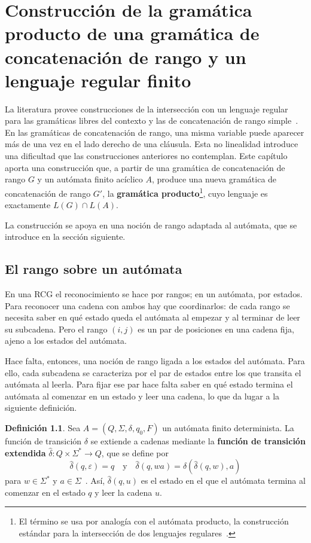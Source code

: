 \documentclass{report}
\theoremstyle{definition}
\newtheorem{definicion}{Definición}[chapter]
\theoremstyle{plain}
\begin{document}
\setcounter{chapter}{4}
\chapter{Construcción de la gramática producto de una gramática de concatenación de rango y un lenguaje regular finito}
\label{cap:interseccion}

La literatura provee construcciones de la intersección con un lenguaje
regular para las gramáticas libres del contexto y las de
concatenación de rango simple~\cite{barhillel1961, bertsch2001rcg}. En las gramáticas
de concatenación de rango, una misma variable puede aparecer más de una
vez en el lado derecho de una cláusula. Esta no linealidad introduce una
dificultad que las construcciones anteriores no contemplan. Este capítulo aporta una
construcción que, a partir de una gramática de concatenación de rango
$G$ y un autómata finito acíclico $A$, produce una nueva gramática de
concatenación de rango $G'$, la \textbf{gramática
producto}\footnote{El término se usa por analogía con el autómata
producto, la construcción estándar para la intersección de dos
lenguajes regulares~\cite{hopcroft2006introduction}.},
cuyo lenguaje es exactamente $L(G) \cap L(A)$.

La construcción se apoya en una noción de rango adaptada al autómata,
que se introduce en la sección siguiente.

\section{El rango sobre un autómata}

En una RCG el reconocimiento se hace por rangos; en un autómata, por
estados. Para reconocer una cadena con ambos hay que coordinarlos: de
cada rango se necesita saber en qué estado queda el autómata al empezar
y al terminar de leer su subcadena. Pero el rango $(i, j)$ es un par de
posiciones en una cadena fija, ajeno a los estados del autómata.

Hace falta, entonces, una noción de rango ligada a los estados del
autómata. Para ello, cada subcadena se caracteriza por el par de estados
entre los que transita el autómata al leerla. Para fijar ese par hace
falta saber en qué estado termina el autómata al comenzar en un estado y
leer una cadena, lo que da lugar a la siguiente definición.

\begin{definicion}
Sea $A = (Q, \Sigma, \delta, q_0, F)$ un autómata finito determinista. La
función de transición $\delta$ se extiende a cadenas mediante la
\textbf{función de transición extendida}
$\hat\delta : Q \times \Sigma^* \to Q$, que se define por
\[
  \hat\delta(q, \varepsilon) = q \quad\text{y}\quad
  \hat\delta(q, wa) = \delta(\hat\delta(q, w), a)
\]
para $w \in \Sigma^*$ y $a \in \Sigma$~\cite{hopcroft2006introduction}.
Así, $\hat\delta(q, u)$ es el estado en el que el autómata termina al
comenzar en el estado $q$ y leer la cadena $u$.
\end{definicion}
\end{document}
